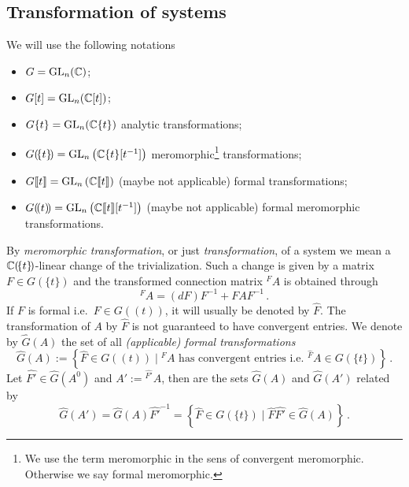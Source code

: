 \subsection{Transformation of systems}
\begin{notations}
  We will use the following notations
  \begin{itemize}
    \item $G=\operatorname{GL}_n(\mathbb{C})$;
    \item $G[t]=\operatorname{GL}_n(\mathbb{C}[t])$;
    \item $G\{t\}=\operatorname{GL}_n(\mathbb{C}\{t\})$ analytic transformations;
    \item $G(\!\{t\}\!)=\operatorname{GL}_n\left(\mathbb{C}\{t\}[t^{-1}]\right)$
      meromorphic\footnote{We use the term meromorphic in the sens of
      convergent meromorphic. Otherwise we say formal meromorphic.}
      transformations;
    \item $G\llbracket t\rrbracket=\operatorname{GL}_n\left(\mathbb{C}\llbracket t\rrbracket\right)$
      (maybe not applicable) formal transformations;
    \item $G(\!(t)\!)=\operatorname{GL}_n\left(\mathbb{C}\llbracket t\rrbracket[t^{-1}]\right)$
      (maybe not applicable) formal meromorphic transformations.
  \end{itemize}
  \begin{comment}
    We will always use the meromorphic ones, in contrast
    to~\cite{boalch,thboalch} where analytic classification is used.
  \end{comment}
\end{notations}
By \emph{meromorphic transformation}, or just \emph{transformation}, of a
system we mean a $\mathbb{C}(\!\{t\}\!)$-linear change of the trivialization.
Such a change is given by a matrix $F\in G(\!\{t\}\!)$ and the transformed
connection matrix ${}^F\!A$ is obtained through
\[
  {}^F\!A=(dF)F^{-1} + FAF^{-1} \,.
\]
If $F$ is formal i.e.\ $F\in G(\!(t)\!)$, it will usually be denoted by
$\hat F$.
The transformation of $A$ by $\hat F$ is not guaranteed to have convergent
entries.
We denote by $\hat G(A)$ the set of all \emph{(applicable) formal
transformations}
\[
  \hat G(A):=\left\{\hat F\in G(\!(t)\!)
    \mid {}^{\hat F}\!A \text{ has convergent entries i.e.\ }
    {}^{\hat F}\!A\in G(\!\{t\}\!)
  \right\}\,.
\]
Let $\hat{F'}\in\hat G(A^0)$ and $A':={}^{\hat{F'}}\!A$, then are the sets
$\hat G(A)$ and $\hat G(A')$ related by
\[
  \hat G(A')=\hat G(A)\hat{F'}^{-1}=\left\{
    \hat F\in G(\!\{t\}\!) \mid \hat F\hat{F'}\in\hat G(A)
  \right\} \,.
\]

